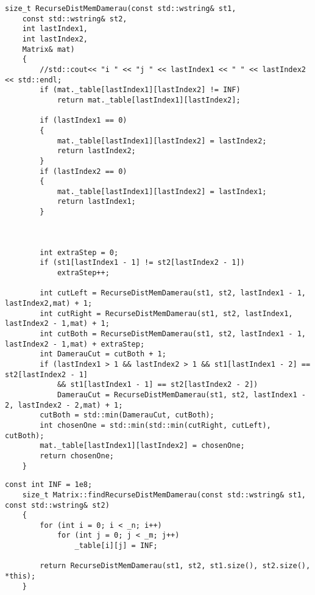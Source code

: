 \begin{lstlisting}[label=lst:damer_rec_mem,caption=Функция нахождения расстояния Дамерау-Левенштейна с использованием рекурсии c мемоизацией]
    size_t RecurseDistMemDamerau(const std::wstring& st1,
	const std::wstring& st2,
	int lastIndex1,
	int lastIndex2,
	Matrix& mat)
    {
        //std::cout<< "i " << "j " << lastIndex1 << " " << lastIndex2 << std::endl;
        if (mat._table[lastIndex1][lastIndex2] != INF)
            return mat._table[lastIndex1][lastIndex2];

        if (lastIndex1 == 0)
        {
            mat._table[lastIndex1][lastIndex2] = lastIndex2;
            return lastIndex2;
        }
        if (lastIndex2 == 0)
        {
            mat._table[lastIndex1][lastIndex2] = lastIndex1;
            return lastIndex1;
        }



        int extraStep = 0;
        if (st1[lastIndex1 - 1] != st2[lastIndex2 - 1])
            extraStep++;

        int cutLeft = RecurseDistMemDamerau(st1, st2, lastIndex1 - 1, lastIndex2,mat) + 1;
        int cutRight = RecurseDistMemDamerau(st1, st2, lastIndex1, lastIndex2 - 1,mat) + 1;
        int cutBoth = RecurseDistMemDamerau(st1, st2, lastIndex1 - 1, lastIndex2 - 1,mat) + extraStep;
        int DamerauCut = cutBoth + 1;
        if (lastIndex1 > 1 && lastIndex2 > 1 && st1[lastIndex1 - 2] == st2[lastIndex2 - 1]
            && st1[lastIndex1 - 1] == st2[lastIndex2 - 2])
            DamerauCut = RecurseDistMemDamerau(st1, st2, lastIndex1 - 2, lastIndex2 - 2,mat) + 1;
        cutBoth = std::min(DamerauCut, cutBoth);
        int chosenOne = std::min(std::min(cutRight, cutLeft), cutBoth);
        mat._table[lastIndex1][lastIndex2] = chosenOne;
        return chosenOne;
    }
\end{lstlisting}

\begin{lstlisting}[label=lst:damer_rec_mem_meth, caption=Метод нахождения расстояния Дамерау-Левенштейна с использованием функции \ref{lst:damer_rec_mem}]
    const int INF = 1e8;
    size_t Matrix::findRecurseDistMemDamerau(const std::wstring& st1, const std::wstring& st2)
    {
        for (int i = 0; i < _n; i++)
            for (int j = 0; j < _m; j++)
                _table[i][j] = INF;
        
        return RecurseDistMemDamerau(st1, st2, st1.size(), st2.size(), *this);
    }
\end{lstlisting}

